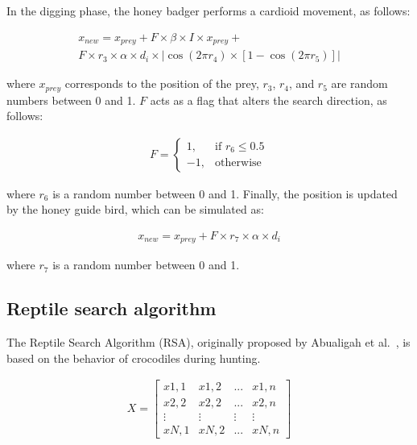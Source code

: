 \documentclass{elsarticle}
\begin{document}
In the digging phase, the honey badger performs a cardioid movement, as follows:

\begin{equation}
\begin{gathered}
x_{new} = x_{prey} + F \times \beta \times I \times x_{prey} + \\
F \times r_3 \times \alpha \times d_i \times \left|\cos(2\pi r_4) \times [1-\cos(2\pi r_5)]\right|
\end{gathered}
\label{eq30}
\end{equation}

\noindent 
where $x_{prey}$ corresponds to the position of the prey, $r_3$, $r_4$, and $r_5$ are random numbers between 0 and 1. $F$ acts as a flag that alters the search direction, as follows:

\begin{equation}
\begin{gathered}
F=
\begin{cases}
1, & \text{if } r_6 \leq 0.5 \\
-1, & \text{otherwise}
\end{cases}
\end{gathered}
\label{eq31}
\end{equation}    

\noindent 
where $r_6$ is a random number between 0 and 1. Finally, the position is updated by the honey guide bird, which can be simulated as:

\begin{equation}
\begin{gathered}
x_{new} = x_{prey} + F \times r_7 \times \alpha \times d_i
\end{gathered}
\label{eq32}
\end{equation}

\noindent 
where $r_7$ is a random number between 0 and 1.

\subsection{Reptile search algorithm}

The Reptile Search Algorithm (RSA), originally proposed by Abualigah et al.~\cite{Abualigah2022}, is based on the behavior of crocodiles during hunting. 

\begin{equation}
\begin{gathered}
X = \begin{bmatrix}
  x1,1 & x1,2 & ... & x1,n  \\
  x2,2 & x2,2 & ... & x2,n  \\
  \vdots & \vdots & \vdots & \vdots \\
  xN,1 & xN,2 & ... & xN,n
\end{bmatrix}
\end{gathered}
\label{eq33}
\end{equation}
\end{document}
